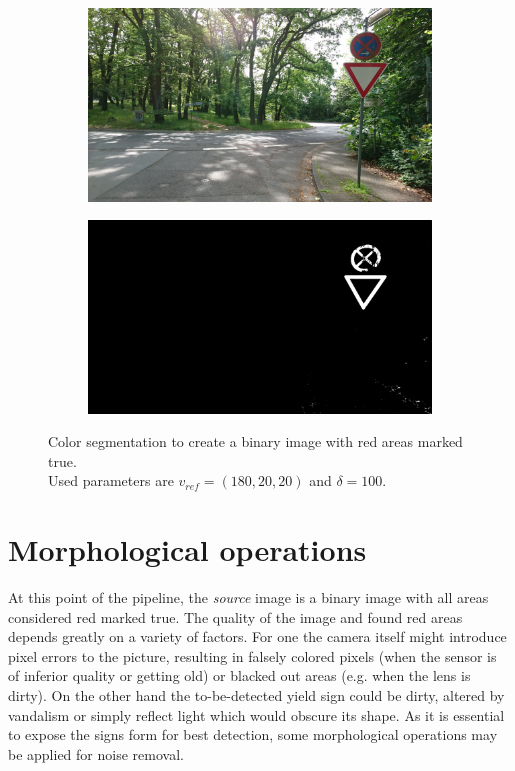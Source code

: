 \documentclass{report}
\begin{document}
\begin{figure}
  \begin{subfigure}[t]{0.5\textwidth}
    \includegraphics[width=1\textwidth]{src/segmentation/original}
  \end{subfigure}
  \quad
  \begin{subfigure}[t]{0.5\textwidth}
    \includegraphics[width=1\textwidth]{src/segmentation/segmented}
  \end{subfigure}
  \caption{Color segmentation to create a binary image with red areas
    marked true. \\ Used parameters are \( v_{ref} = (180, 20, 20) \)
    and \( \delta = 100 \).}
\end{figure}


\section{Morphological operations}
\label{sec:pipeline_morph}

At this point of the pipeline, the \textit{source} image is a binary
image with all areas considered red marked true. The quality of the
image and found red areas depends greatly on a variety of factors. For
one the camera itself might introduce pixel errors to the picture,
resulting in falsely colored pixels (when the sensor is of inferior
quality or getting old) or blacked out areas (e.g. when the lens is
dirty). On the other hand the to-be-detected yield sign could be
dirty, altered by vandalism or simply reflect light which would
obscure its shape. As it is essential to expose the signs form for
best detection, some morphological operations may be applied for noise
removal.
\end{document}
